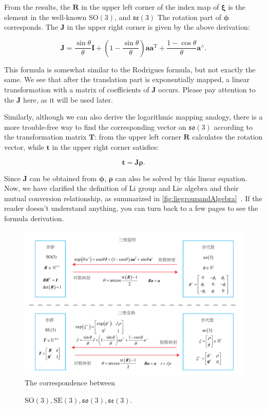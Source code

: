 From the results, the $\bm{R}$ in the upper left corner of the index map of $\boldsymbol{\xi}$ is the element in the well-known $\mathrm{SO}(3)$, and $\mathfrak{se }(3)$ The rotation part of $\boldsymbol{\phi}$ corresponds. The $\bm{J}$ in the upper right corner is given by the above derivation:

\begin{equation}
\label{eq:lieAlgebraJacobian}
\bm{J} = \frac{{\sin \theta }}{\theta } \bm{I} + \left( {1 - \frac{{\sin \theta }}{\theta }} \right) \bm{a} { \bm{a}^\mathrm{T}} + \frac{{1 - \cos \theta }}{\theta }{ \bm{a}^ \wedge }.
\end{equation}

This formula is somewhat similar to the Rodrigues formula, but not exactly the same. We see that after the translation part is exponentially mapped, a linear transformation with a matrix of coefficients of $\bm{J}$ occurs. Please pay attention to the $\bm{J}$ here, as it will be used later.

Similarly, although we can also derive the logarithmic mapping analogy, there is a more trouble-free way to find the corresponding vector on $\mathfrak{so}(3)$ according to the transformation matrix $\bm{T}$: from the upper left corner $\bm{R}$ calculates the rotation vector, while $\bm{t}$ in the upper right corner satisfies:

\begin{equation}
	\bm{t} = \bm{J} \boldsymbol{\rho}.
\end{equation}

Since $\bm{J}$ can be obtained from $\boldsymbol{\phi}$, $\boldsymbol{\rho}$ can also be solved by this linear equation. Now, we have clarified the definition of Li group and Lie algebra and their mutual conversion relationship, as summarized in \autoref{fig:liegroupandAlgebra}~. If the reader doesn't understand anything, you can turn back to a few pages to see the formula derivation.

\begin{figure}[!ht]
	\centering
	\includegraphics[width=1.0\textwidth]{chapter04/lieGroup/liegroupandAlgebra.pdf}
	The correspondence between \caption{$\mathrm{SO}(3), \mathrm{SE}(3), \mathfrak{so}(3), \mathfrak{se}(3)$. }
	\label{fig:liegroupandAlgebra}
\end{figure}

\clearpage